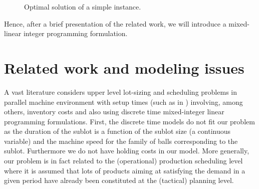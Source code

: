 \begin{figure}[htbp]
\centering 
{}  
\caption{Optimal solution of a simple instance.}
\label{fig_smallex}
\end{figure}


Hence, after a brief presentation of the related work, we will
introduce a mixed-linear integer programming formulation.


\section{Related work and modeling issues}
\label{sec:review}

A vast literature considers upper level lot-sizing and scheduling
problems in parallel machine environment with setup times (such as in
\cite{james2011single,xiao2013mip}) involving, among others, inventory
costs and also using discrete time mixed-integer linear programming
formulations. First, the discrete time models do not fit our problem
as the duration of the sublot is a function of the sublot size (a
continuous variable) and the machine speed for the family of balls
corresponding to the sublot. Furthermore we do not have holding costs
in our model. More generally, our problem is in fact related to the
(operational) production scheduling level where it is assumed that
lots of products aiming at satisfying the demand in a given period
have already been constituted at the (tactical) planning level.

